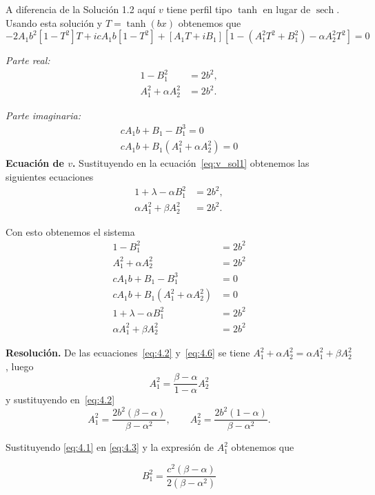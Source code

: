 \documentclass[letterpaper,11pt]{exam}
\newcommand{\sech}{\operatorname{sech}}
\theoremstyle{plain}
\begin{document}
A diferencia de la Solución 1.2 aquí $v$ tiene perfil tipo $\tanh$ en lugar de $\sech$. Usando esta solución y $T=\tanh(bx)$ obtenemos que 
\begin{equation}
    -2A_1b^2[1-T^2]T+icA_1b[1-T^2]+[A_1T+iB_1][1-(A_1^2T^2+B_1^2)-\alpha A_2^2T^2] =0
\end{equation}


\emph{Parte real:}
\begin{align}
  1 - B_1^2 &= 2b^2, \label{eq:123r1}\\
  A_1^2 + \alpha A_2^2 &= 2b^2. \label{eq:123r2}
\end{align}

\emph{Parte imaginaria:}
\begin{align}
    cA_1b+B_1-B_1^3=0 \\
    cA_1b+B_1(A_1^2+\alpha A_2^2)=0
\end{align}
\textbf{Ecuación de $v$.}
Sustituyendo en la ecuación~\eqref{eq:v_sol1} obtenemos las siguientes ecuaciones 
\begin{align}
  1 + \lambda - \alpha B_1^2 &= 2b^2, \label{eq:123v1}\\
  \alpha A_1^2 + \beta A_2^2 &= 2b^2. \label{eq:123v2}
\end{align}


Con esto obtenemos el sistema 
\begin{align}
  1 - B_1^2 &= 2b^2 \label{eq:4.1}\\
  A_1^2 + \alpha A_2^2 &= 2b^2  \label{eq:4.2} \\
  cA_1b+B_1-B_1^3&=0 \label{eq:4.3}  \\
  cA_1b+B_1(A_1^2+\alpha A_2^2)&=0 \label{eq:4.4} \\
  1 + \lambda - \alpha B_1^2 &= 2b^2 \label{eq:4.5} \\
  \alpha A_1^2 + \beta A_2^2 &= 2b^2 \label{eq:4.6}
\end{align}

\textbf{Resolución.}
De las ecuaciones~\eqref{eq:4.2} y~\eqref{eq:4.6} se tiene
$A_1^2 + \alpha A_2^2 = \alpha A_1^2 + \beta A_2^2$, luego
\[
  A_1^2= \frac{\beta - \alpha}{1 - \alpha} A_2^2
\]
y sustituyendo en~\eqref{eq:4.2}
\[
  A_1^2 = \frac{2b^2(\beta-\alpha)}{\beta-\alpha^2},
  \qquad
  A_2^2 = \frac{2b^2(1-\alpha)}{\beta-\alpha^2}.
\]


Sustituyendo \eqref{eq:4.1} en \eqref{eq:4.3} y la expresión de $A_1^2$ obtenemos que 

\begin{equation}
    B_1^2=\frac{c^2(\beta-\alpha)}{2(\beta-\alpha^2)}
\end{equation}
\end{document}
